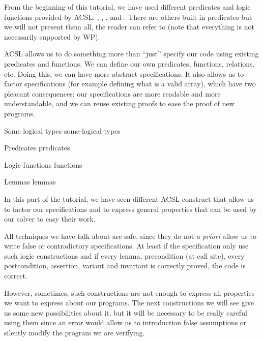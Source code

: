 From the beginning of this tutorial, we have used different predicates
and logic functions provided by ACSL: ,
, ,
 and . There are others
built-in predicates but we will not present them all, the reader can refer to
(note that everything is not necessarily supported by WP).



ACSL allows us to do something more than ``just'' specify our code using
existing predicates and functions. We can define our own predicates,
functions, relations, etc. Doing this, we can have more abstract
specifications. It also allows us to factor specifications (for example
defining what is a valid array), which have two pleasant consequences:
our specifications are more readable and more understandable, and we can
reuse existing proofs to ease the proof of new programs.



\begin{levelTwo}
  {Some logical types}
  {some-logical-types}
\end{levelTwo}

\begin{levelTwo}
  {Predicates}
  {predicates}
\end{levelTwo}

\begin{levelTwo}
  {Logic functions}
  {functions}
\end{levelTwo}

\begin{levelTwo}
  {Lemmas}
  {lemmas}
\end{levelTwo}

\horizontalLine
\newpage

In this part of the tutorial, we have seen different ACSL construct that
allow us to factor our specifications and to express general properties
that can be used by our solver to easy their work.




All techniques we have talk about are safe, since they do not \emph{a
priori} allow us to write false or contradictory specifications. At
least if the specification only use such logic constructions and if
every lemma, precondition (at call site), every postcondition,
assertion, variant and invariant is correctly proved, the code is
correct.




However, sometimes, such constructions are not enough to express all
properties we want to express about our programs. The next constructions
we will see give us some new possibilities about it, but it will be
necessary to be really careful using them since an error would allow us
to introduction false assumptions or silently modify the program we are
verifying.
